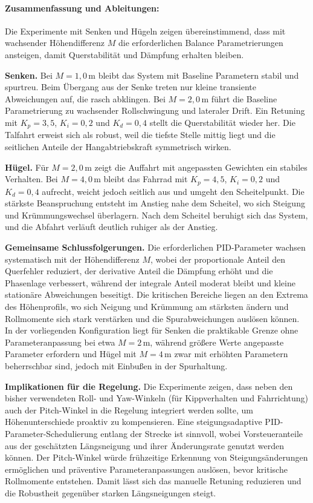 \paragraph{Zusammenfassung und Ableitungen:}

Die Experimente mit Senken und Hügeln zeigen übereinstimmend, dass mit wachsender Höhendifferenz \(M\) die erforderlichen Balance Parametrierungen ansteigen, 
damit Querstabilität und Dämpfung erhalten bleiben. 

\textbf{Senken.} Bei \(M=1{,}0\,\text{m}\) bleibt das System mit Baseline Parametern stabil und spurtreu. Beim Übergang aus der Senke treten nur kleine 
transiente Abweichungen auf, die rasch abklingen. Bei \(M=2{,}0\,\text{m}\) führt die Baseline Parametrierung zu wachsender Rollschwingung und lateraler Drift. 
Ein Retuning mit \(K_p=3{,}5\), \(K_i=0{,}2\) und \(K_d=0{,}4\) stellt die Querstabilität wieder her. Die Talfahrt erweist sich als robust, weil die tiefste 
Stelle mittig liegt und die seitlichen Anteile der Hangabtriebskraft symmetrisch wirken.

\textbf{Hügel.} Für \(M=2{,}0\,\text{m}\) zeigt die Auffahrt mit angepassten Gewichten ein stabiles Verhalten. Bei \(M=4{,}0\,\text{m}\) bleibt das Fahrrad 
mit \(K_p=4{,}5\), \(K_i=0{,}2\) und \(K_d=0{,}4\) aufrecht, weicht jedoch seitlich aus und umgeht den Scheitelpunkt. Die stärkste Beanspruchung entsteht 
im Anstieg nahe dem Scheitel, wo sich Steigung und Krümmungswechsel überlagern. Nach dem Scheitel beruhigt sich das System, und die Abfahrt verläuft deutlich ruhiger als der Anstieg.

\textbf{Gemeinsame Schlussfolgerungen.} Die erforderlichen PID-Parameter wachsen systematisch mit der Höhendifferenz $M$, wobei der proportionale Anteil 
den Querfehler reduziert, der derivative Anteil die Dämpfung erhöht und die Phasenlage verbessert, während der integrale Anteil moderat bleibt und kleine 
stationäre Abweichungen beseitigt. Die kritischen Bereiche liegen an den Extrema des Höhenprofils, wo sich Neigung und Krümmung am stärksten ändern und 
Rollmomente sich stark verstärken und die Spurabweichungen auslösen können. In der vorliegenden Konfiguration liegt für Senken die praktikable Grenze ohne 
Parameteranpassung bei etwa $M=2\,\text{m}$, während größere Werte angepasste Parameter erfordern und Hügel mit $M=4\,\text{m}$ zwar mit erhöhten Parametern 
beherrschbar sind, jedoch mit Einbußen in der Spurhaltung.

\textbf{Implikationen für die Regelung.} Die Experimente zeigen, dass neben den bisher verwendeten Roll- und Yaw-Winkeln (für Kippverhalten und Fahrrichtung) 
auch der Pitch-Winkel in die Regelung integriert werden sollte, um Höhenunterschiede proaktiv zu kompensieren. Eine steigungsadaptive PID-Parameter-Schedulierung entlang 
der Strecke ist sinnvoll, wobei Vorsteueranteile aus der geschätzten Längsneigung und ihrer Änderungsrate genutzt werden können. Der Pitch-Winkel würde frühzeitige 
Erkennung von Steigungsänderungen ermöglichen und präventive Parameteranpassungen auslösen, bevor kritische Rollmomente entstehen. 
Damit lässt sich das manuelle Retuning reduzieren und die Robustheit gegenüber starken Längsneigungen steigt.
  
